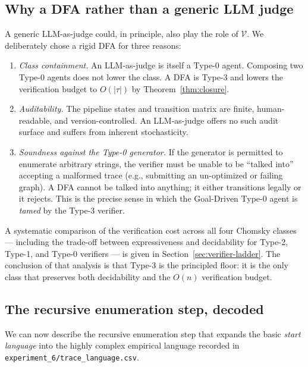 \subsection{Why a DFA rather than a generic LLM judge}

A generic LLM-as-judge could, in principle, also play the role of
$\mathcal{V}$.  We deliberately chose a rigid DFA for three
reasons:
\begin{enumerate}
\item \emph{Class containment.}  An LLM-as-judge is itself a
Type-0 agent.  Composing two Type-0 agents does not lower the
class.  A DFA is Type-3 and lowers the
verification budget to $O(|\tau|)$ by Theorem~\ref{thm:closure}.
\item \emph{Auditability.}  The pipeline states and transition
matrix are finite, human-readable, and version-controlled. An
LLM-as-judge offers no such audit surface and suffers from inherent
stochasticity.
\item \emph{Soundness against the Type-0 generator.}  If the
generator is permitted to enumerate arbitrary strings, the
verifier must be unable to be ``talked into'' accepting a
malformed trace (e.g., submitting an un-optimized or
failing graph). A DFA cannot be talked into anything; it
either transitions legally or it rejects.  This is the precise
sense in which the Goal-Driven Type-0 agent is \emph{tamed} by the
Type-3 verifier.
\end{enumerate}

A systematic comparison of the verification cost across all four
Chomsky classes --- including the trade-off between expressiveness
and decidability for Type-2, Type-1, and Type-0 verifiers --- is
given in Section~\ref{sec:verifier-ladder}.  The conclusion of that
analysis is that Type-3 is the principled floor: it is the only class
that preserves both decidability and the $O(n)$ verification budget.

\subsection{The recursive enumeration step, decoded}

We can now describe the recursive enumeration step that expands
the basic \emph{start language} into the highly complex empirical
language recorded in \texttt{experiment\_6/trace\_language.csv}.

